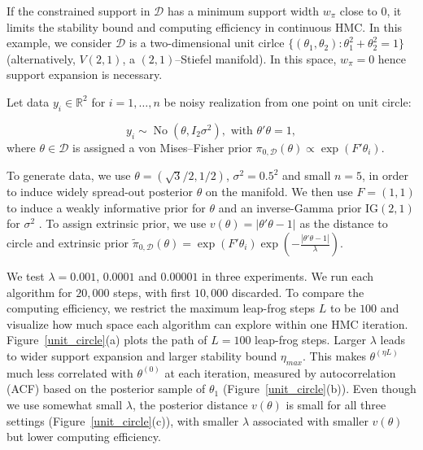 \documentclass[10pt]{article}
\newcommand{\mc}[1]{\mathcal{#1}}
\DeclareMathOperator{\No}{No}
\DeclareMathOperator{\1}{\mathbbm{1}}
\begin{document}
If the constrained support in $\mc D$ has a minimum support width $w_\pi$ close to $0$, it limits the stability bound and computing efficiency in continuous HMC. In this example, we consider $\mc D$ is a two-dimensional unit cirlce $\{(\theta_1,\theta_2):\theta_1^2+\theta_2^2=1\}$ (alternatively, $V(2,1)$, a $(2,1)$--Stiefel manifold). In this space, $w_\pi =0$ hence support expansion is necessary.

Let data $y_i\in \mathbb{R}^2$ for $i=1,\ldots,n$  be noisy realization from one point on unit circle:

$$y_i\sim \No(\theta, I_2\sigma^2),\text{ with } \theta'\theta=1,$$
where $\theta \in \mc D$ is assigned a von Mises--Fisher prior $\pi_{0,\mc D}(\theta) \propto \exp(F'\theta_i)$.

 To generate data, we use $\theta= (\sqrt 3/2, 1/2)$, $\sigma^2=0.5^2$ and small $n=5$, in order to induce widely spread-out posterior $\theta$ on the manifold. We then use $F=(1,1)$ to induce a weakly informative prior for $\theta$ and an inverse-Gamma prior $\text{IG}(2,1)$ for $\sigma^2$ . To assign extrinsic prior, we use $v(\theta)=|\theta'\theta -1|$ as the distance to circle and extrinsic prior $\tilde\pi_{0,\mc D}(\theta)= \exp(F'\theta_i) \exp(-\frac{|\theta'\theta -1|}{\lambda})$.

We test $\lambda = 0.001$, $0.0001$ and $0.00001$ in three experiments. We run each algorithm for $20,000$ steps, with first $10,000$ discarded. To compare the computing efficiency, we restrict the maximum leap-frog steps $L$ to be $100$ and visualize how much space each algorithm can explore within one HMC iteration. Figure~\ref{unit_circle}(a) plots the path of $L=100$ leap-frog steps. Larger $\lambda$ leads to wider support expansion and larger stability bound $\eta_{max}$. This makes $\theta^{(\eta L)}$  much less correlated with $\theta^{(0)}$ at each iteration, measured by autocorrelation (ACF) based on the posterior sample of $\theta_1$ (Figure~\ref{unit_circle}(b)). Even though we use somewhat small $\lambda$, the posterior distance $v(\theta)$ is small for all three settings (Figure~\ref{unit_circle}(c)), with smaller $\lambda$ associated with smaller $v(\theta)$ but lower computing efficiency.
\end{document}
